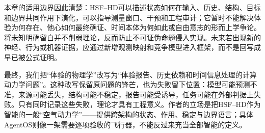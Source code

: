 本章的适用边界因此清楚：HSF--HD可以描述状态如何在输入、历史、结构、目标和边界共同作用下演化，可以指导测量窗口、干预和工程审计；它暂时不能解决体验为何存在、他心如何最终确证、时间本体为何如此或自由意志的形而上学争论。将未知明确留白并不削弱理论，反而防止不可证伪命题侵入实现。未来若出现新的神经、行为或机器证据，应通过新增观测映射和竞争模型进入框架，而不是回写成早已被公式证明。

最终，我们把“体验的物理学”改写为“体验报告、历史依赖和时间信息处理的计算动力学问题”。这种改写保留原问题的锋芒，也为失败留下位置：模型可能预测不准，来源可能丢失，结构可能不稳定，报告可能受诱导，任务可能在外部判据上失败。只有同时记录这些失败，理论才具有工程意义。作者的立场是把HSF--HD作为智能的一般“空气动力学”——提供跨架构的状态、作用、稳定与边界语言；具体AgentOS则像一架需要逐项验收的飞行器，不能反过来充当全部智能的定义。
